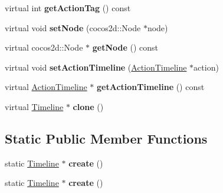\begin{DoxyCompactItemize}
\item 
\mbox{\label{classTimeline_ac5c3aeaddff18adb0042aeafbaf244f0}} 
virtual int {\bfseries get\+Action\+Tag} () const
\item 
\mbox{\label{classTimeline_ab0ac3fe8ca0b8779053deb556f796112}} 
virtual void {\bfseries set\+Node} (cocos2d\+::\+Node $\ast$node)
\item 
\mbox{\label{classTimeline_acb4f55f8178aa35aed78f1fa6fe140c9}} 
virtual cocos2d\+::\+Node $\ast$ {\bfseries get\+Node} () const
\item 
\mbox{\label{classTimeline_a8cc85adef76eb58005010586d8772ec2}} 
virtual void {\bfseries set\+Action\+Timeline} (\hyperlink{classActionTimeline}{Action\+Timeline} $\ast$action)
\item 
\mbox{\label{classTimeline_ad57f63ede9b4e9312ed11a2643da6e21}} 
virtual \hyperlink{classActionTimeline}{Action\+Timeline} $\ast$ {\bfseries get\+Action\+Timeline} () const
\item 
\mbox{\label{classTimeline_afd21b3c35176fe3db7f00d83c72dd67f}} 
virtual \hyperlink{classTimeline}{Timeline} $\ast$ {\bfseries clone} ()
\end{DoxyCompactItemize}
\subsection*{Static Public Member Functions}
\begin{DoxyCompactItemize}
\item 
\mbox{\label{classTimeline_accddf24264aef4dae4d68165e63c7af5}} 
static \hyperlink{classTimeline}{Timeline} $\ast$ {\bfseries create} ()
\item 
\mbox{\label{classTimeline_a81a2314c4c55b93081327aaf85c79c6e}} 
static \hyperlink{classTimeline}{Timeline} $\ast$ {\bfseries create} ()
\end{DoxyCompactItemize}
